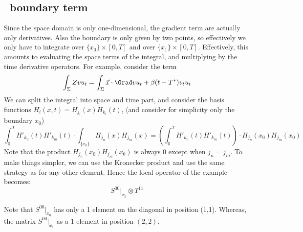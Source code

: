 \documentclass[]{report}
\begin{document}
    \subsection*{\Sigma\ boundary term}
    Since the space domain is only one-dimensional, the gradient term are actually only derivatives. Also the boundary is only given by two points, so effectively we only have to integrate over $\{x_0\}\times [0,T]$ and over $\{x_1\} \times [0,T]$. Effectively, this amounts to evaluating the space terms of the integral, and multiplying by the time derivative operators. For example, consider the term
    \begin{equation*}
        \int_{\Sigma} Zv u_t = \int_{\Sigma} \vec{x} \cdot \Grad v u_t + \beta(t-T^*) v_t u_t
    \end{equation*}
    We can split the integral into space and time part, and consider the basis functions $H_i(x,t) = H_{j_i}(x)H_{k_i}(t)$, (and consider for simplicity only the boundary $x_0$)
    \begin{equation*}
        \int_0^T H'_{k_n}(t)H'_{k_m}(t) \cdot \int_{\{x_0\}} H_{j_n}(x) H_{j_m}(x) = \left(\int_0^T H'_{k_n}(t)H'_{k_m}(t)\right) \cdot H_{j_n}(x_0)H_{j_m}(x_0)
    \end{equation*}
    Note that the product $ H_{j_n}(x_0) H_{j_m}(x_0)$ is always 0 except when $j_n = j_m$. To make things simpler, we can use the Kronecker product and use the same strategy as for any other element.
    Hence the local operator of the example becomes:
    \begin{equation*}
        S^{00}\Big|_{x_0} \otimes T^{11}
    \end{equation*}

    Note that $S^{00}\Big|_{x_0}$ has only a 1 element on the diagonal in position (1,1). Whereas, the matrix $S^{00}\Big|_{x_1}$ as a 1 element in position $(2,2)$.
\end{document}
